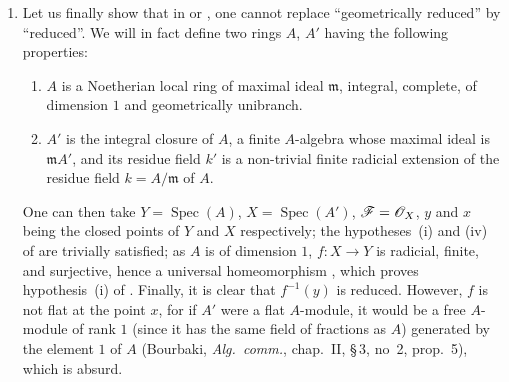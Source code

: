 \begin{remarks}[15.2.4]
\begin{enumerate}[label=(\roman*)]
Here $f$ is a finite, surjective and radicial morphism, hence a universal homeomorphism , but it is not flat at the point $x$, for if $\sh{O}_x$ were a flat $\sh{O}_y$-module, it would be an $\sh{O}_y$-module
free of rank $1$ generated by the element $1$ of $\sh{O}_x$ (Bourbaki, \emph{Alg.\ comm.}, chap.~II, \S\,3, no~2, prop.~5), which is absurd.
  \item Let us finally show that in  or , one cannot replace ``geometrically reduced'' by ``reduced''.
We will in fact define two rings $A$, $A'$ having the following properties:
\begin{enumerate}[label=\arabic*)]
  \item $A$ is a Noetherian local ring of maximal ideal $\mathfrak{m}$, integral, complete, of dimension $1$ and geometrically unibranch.
  \item $A'$ is the integral closure of $A$, a finite $A$-algebra whose maximal ideal is $\mathfrak{m}A'$, and its residue field $k'$ is a non-trivial finite radicial extension of the residue field $k=A/\mathfrak{m}$ of $A$.
\end{enumerate}
One can then take $Y=\operatorname{Spec}(A)$, $X=\operatorname{Spec}(A')$, $\mathscr{F}=\mathscr{O}_X$, $y$ and $x$ being the closed points of $Y$ and $X$ respectively; the hypotheses~(i) and (iv) of  are trivially satisfied; as $A$ is of dimension $1$, $f:X\to Y$ is radicial, finite, and surjective, hence a universal homeomorphism , which proves hypothesis~(i) of .
Finally, it is clear that $f^{-1}(y)$ is reduced.
However, $f$ is not flat at the point $x$, for if $A'$ were a flat $A$-module, it would be a free $A$-module of rank $1$ (since it has the same field of fractions as $A$) generated by the element $1$ of $A$ (Bourbaki, \emph{Alg.\ comm.}, chap.~II, \S\,3, no~2, prop.~5), which is absurd.


\end{enumerate}
\end{remarks}
